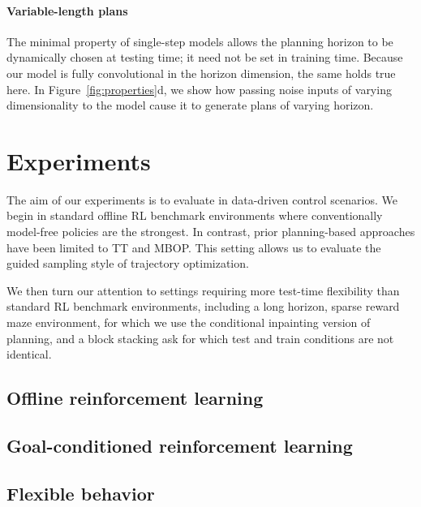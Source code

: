 \paragraph{Variable-length plans}
The minimal property of single-step models allows the planning horizon to be dynamically chosen at testing time; it need not be set in training time.
Because our model is fully convolutional in the horizon dimension, the same holds true here.
In Figure~\ref{fig:properties}d, we show how passing noise inputs of varying dimensionality to the model cause it to generate plans of varying horizon.



\section{Experiments}

The aim of our experiments is to evaluate \method in data-driven control scenarios.
We begin in standard offline RL benchmark environments where conventionally model-free policies are the strongest.
In contrast, prior planning-based approaches have been limited to TT and MBOP.
This setting allows us to evaluate the guided sampling style of trajectory optimization.

We then turn our attention to settings requiring more test-time flexibility than standard RL benchmark environments, including 
a long horizon, sparse reward maze environment, for which we use the conditional inpainting version of planning, and a block stacking
ask for which test and train conditions are not identical.

\subsection{Offline reinforcement learning}

\subsection{Goal-conditioned reinforcement learning}

\subsection{Flexible behavior}





